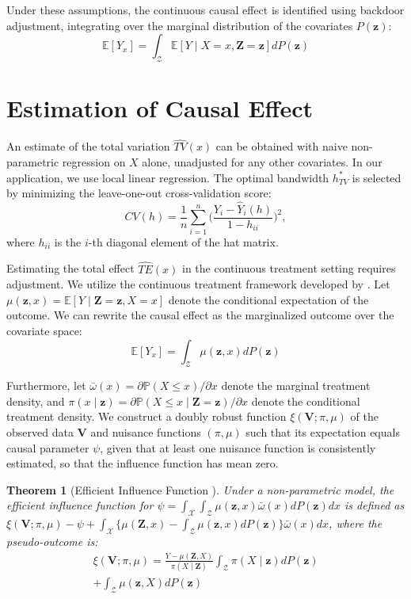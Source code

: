 \documentclass{article}
\theoremstyle{plain}
\newtheorem{theorem}{Theorem}
\theoremstyle{definition}
\theoremstyle{remark}
\begin{document}
Under these assumptions, the continuous causal effect is identified using 
backdoor adjustment, integrating over the marginal distribution of the 
covariates $P(\mathbf{z})$:
$$\mathbb{E}[Y_x] = \int_{\mathcal{Z}} \mathbb{E}[Y \mid X = x, \mathbf{Z} = \mathbf{z}] dP(\mathbf{z})$$

\section{Estimation of Causal Effect}
\label{estimation}


An estimate of the total variation $\widehat{TV}(x)$ can be obtained
with naive non-parametric regression on $X$ alone, unadjusted for any 
other covariates. In our application, we use local linear regression. The optimal bandwidth $h_{TV}^*$ is selected by minimizing the leave-one-out cross-validation score:
\begin{equation*}
\label{eq:cv}
    CV(h) = \frac{1}{n}\sum_{i=1}^n\Big(\frac{Y_i-\hat{Y}_i(h)}{1-h_{ii}}\Big)^2,
\end{equation*}
where $h_{ii}$ is the $i$-th diagonal element of the hat matrix.

Estimating the total effect $\widehat{TE}(x)$ in the continuous treatment 
setting requires adjustment. We utilize the continuous treatment framework developed by 
\citet{kennedy2017non}. Let $\mu(\mathbf{z}, x) = \mathbb{E}[Y \mid \mathbf{Z} = \mathbf{z}, X = x]$ 
denote the conditional expectation of the outcome. We can rewrite the 
causal effect as the marginalized outcome over the covariate space:
$$\mathbb{E}[Y_x] = \int_{\mathcal{Z}} \mu(\mathbf{z}, x) dP(\mathbf{z})$$

Furthermore, let $\bar{\omega}(x) = \partial \mathbb{P}(X \leq x)/\partial x$ 
denote the marginal treatment density, and $\pi(x \mid \mathbf{z}) = \partial \mathbb{P}(X \leq x \mid \mathbf{Z} = \mathbf{z}) / \partial x$ 
denote the conditional treatment density. 
We construct a doubly robust function $\xi(\mathbf{V}; \pi, \mu)$ 
of the observed data $\mathbf{V}$ and nuisance functions $(\pi, \mu)$ such that 
its expectation equals causal parameter $\psi$, given that at least one 
nuisance function is consistently estimated, so that the influence function has mean zero.

\begin{theorem}[Efficient Influence Function \citep{kennedy2017non}]
    Under a non-parametric model, the efficient influence function for 
    $\psi = \int_{\mathcal{X}} \int_{\mathcal{Z}} \mu(\mathbf{z}, x) \bar{\omega}(x) dP(\mathbf{z}) dx$ 
    is defined as $\xi(\mathbf{V}; \pi, \mu) - \psi + \int_{\mathcal{X}} \{ \mu(\mathbf{Z}, x) - \int_{\mathcal{Z}} \mu(\mathbf{z}, x) dP(\mathbf{z}) \} \bar{\omega}(x) dx$, 
    where the pseudo-outcome is:
    \begin{multline*}
        \xi(\mathbf{V}; \pi, \mu) = \frac{Y - \mu(\mathbf{Z}, X)}{\pi(X \mid \mathbf{Z})} \int_{\mathcal{Z}} \pi(X \mid \mathbf{z}) dP(\mathbf{z}) \\
        + \int_{\mathcal{Z}} \mu(\mathbf{z}, X) dP(\mathbf{z})
    \end{multline*}
\end{theorem}
\end{document}
